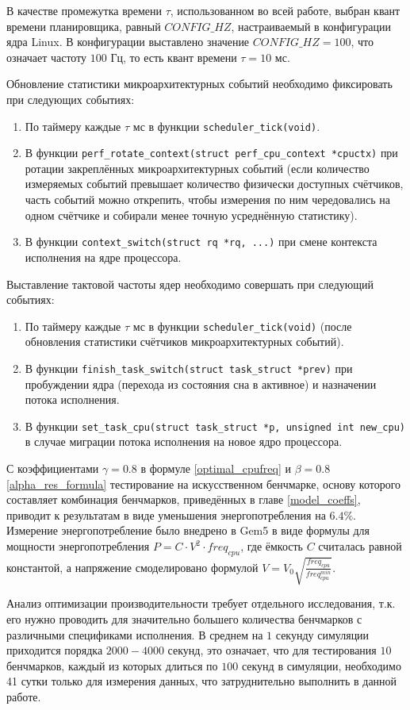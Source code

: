     В качестве промежутка времени $\tau$, использованном во всей работе, выбран квант времени планировщика,
    равный $CONFIG\_HZ$, настраиваемый в конфигурации ядра Linux. В конфигурации выставлено значение
    $CONFIG\_HZ = 100$, что означает частоту $100$ Гц, то есть квант времени $\tau = 10$ мс.

    Обновление статистики микроархитектурных событий необходимо фиксировать при следующих событиях:
    \begin{enumerate}
        \item По таймеру каждые $\tau$ мс в функции \lstinline{scheduler_tick(void)}.
        \item В функции \lstinline{perf_rotate_context(struct perf_cpu_context *cpuctx)} при ротации
        закреплённых микроархитектурных событий (если количество измеряемых событий
        превышает количество физически доступных счётчиков, часть событий можно открепить, чтобы измерения по ним
        чередовались на одном счётчике и собирали менее точную усреднённую статистику).
        \item В функции \lstinline{context_switch(struct rq *rq, ...)} при смене контекста исполнения на
        ядре процессора.
    \end{enumerate}

    Выставление тактовой частоты ядер необходимо совершать при следующий событиях:
    \begin{enumerate}
        \item По таймеру каждые $\tau$ мс в функции \lstinline{scheduler_tick(void)} (после обновления статистики
        счётчиков микроархитектурных событий).
        \item В функции \lstinline{finish_task_switch(struct task_struct *prev)} при пробуждении ядра
        (перехода из состояния сна в активное) и назначении потока исполнения.
        \item В функции \lstinline{set_task_cpu(struct task_struct *p, unsigned int new_cpu)} в случае миграции
        потока исполнения на новое ядро процессора.
    \end{enumerate}

    С коэффициентами $\gamma = 0.8$ в формуле \eqref{optimal_cpufreq} и $\beta = 0.8$ \eqref{alpha_res_formula}
    тестирование на искусственном бенчмарке, основу которого составляет комбинация бенчмарков, приведённых в
    главе \ref{model_coeffs}, приводит к результатам в виде уменьшения энергопотребления на $6.4\%$. Измерение
    энергопотребление было внедрено в Gem5 в виде формулы для мощности энергопотребления $P = C \cdot V^2 \cdot freq_{cpu}$,
    где ёмкость $C$ считалась равной константой, а напряжение смоделировано формулой
    $V = V_0 \sqrt{\frac{freq_{cpu}}{freq_{cpu}^{min}}}$.

    Анализ оптимизации производительности требует отдельного исследования, т.к. его нужно проводить для значительно
    большего количества бенчмарков с различными спецификами исполнения. В среднем на $1$ секунду симуляции приходится
    порядка $2000-4000$ секунд, это означает, что для тестирования $10$ бенчмарков, каждый из которых длиться
    по $100$ секунд в симуляции, необходимо 41 сутки только для измерения данных, что затруднительно выполнить
    в данной работе.

\newpage
